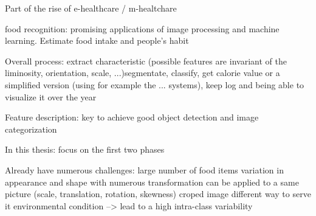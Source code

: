 Part of the rise of e-healthcare / m-healtchare \cite{Hillestad2005, Menachemi2011}

food recognition: promising applications of image processing and machine learning. Estimate food intake and people's habit

Overall process:
extract characteristic (possible features are invariant of the liminosity, orientation, scale, ...)segmentate, classify, get calorie value or a simplified version (using for example the ... systems), keep log and being able to visualize it over the year

Feature description: key to achieve good object detection and image categorization

In this thesis: focus on the first two phases

Already have numerous challenges:
large number of food items
variation in appearance and shape with numerous transformation can be applied to a same picture (scale, translation, rotation, skewness)
croped image
different way to serve it
environmental condition
--> lead to a high intra-class variability

